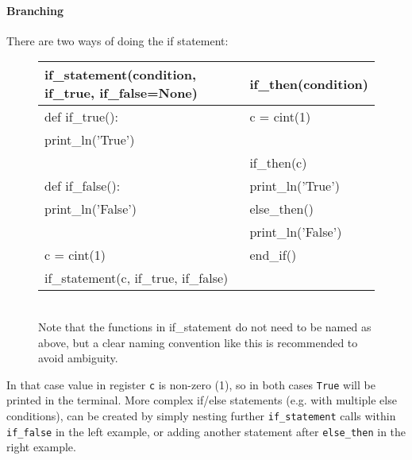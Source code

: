 \newpage

\paragraph{Branching}
There are two ways of doing the if statement: 
\begin{figure}[h!]
\begin{tabular}{|l|l|} \hline
\textbf{if_statement(condition, if_true, if_false=None)} & \textbf{if_then(condition)} \\ \hline
def if_true():                                           & c = cint(1)                 \\
\hspace{5 mm}print_ln('True')                            &                             \\
                                                         & if_then(c)                  \\
def if_false():                                          & print_ln('True')            \\
\hspace{5 mm}print_ln('False')                           & else_then()                 \\
                                                         & print_ln('False')           \\
c = cint(1)                                              & end_if()                    \\
if_statement(c, if_true, if_false)                       &                             \\ \hline
\end{tabular}
\begin{footnotesize}
\\ Note that the functions in if_statement do not need to be named as above, but a clear naming convention like this is recommended to avoid ambiguity.
\end{footnotesize}
\end{figure}
In that case value in register \verb|c| is non-zero (1), so in both cases \verb|True| will be printed in the terminal. More complex if/else statements (e.g. with multiple else conditions), can be created by simply nesting further \verb|if_statement| calls within \verb|if_false| in the left example, or adding another statement after \verb|else_then| in the right example. \\

